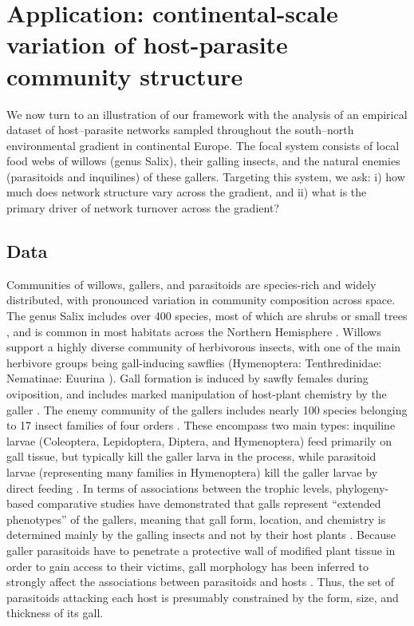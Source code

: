 \documentclass[12pt]{article}
\begin{document}

\section*{Application: continental-scale variation of host-parasite community structure}

We now turn to an illustration of our framework with the analysis of an
empirical dataset of host–parasite networks sampled throughout the south–north
environmental gradient in continental Europe. The focal system consists of
local food webs of willows (genus Salix), their galling insects, and the
natural enemies (parasitoids and inquilines) of these gallers. Targeting this
system, we ask: i) how much does network structure vary across the gradient,
and ii) what is the primary driver of network turnover across the gradient?

\subsection*{Data}

Communities of willows, gallers, and parasitoids are species-rich and
widely distributed, with pronounced variation in community composition across
space. The genus Salix includes over 400 species, most of which are shrubs or
small trees \citep{Argus1997}, and is common in most habitats across the
Northern Hemisphere \citep{Skvortsov1999}. Willows support a highly diverse
community of herbivorous insects, with one of the main herbivore groups being
gall-inducing sawflies (Hymenoptera: Tenthredinidae: Nematinae: Euurina
\citep{Kopelke1999}). Gall formation is induced by sawfly females during
oviposition, and includes marked manipulation of host-plant chemistry by the
galler \citep{Nyman2000}. The enemy community of the gallers includes nearly
100 species belonging to 17 insect families of four orders
\citep{Kopelke2000}. These encompass two main types: inquiline larvae
(Coleoptera, Lepidoptera, Diptera, and Hymenoptera) feed primarily on gall
tissue, but typically kill the galler larva in the process, while parasitoid
larvae (representing many families in Hymenoptera) kill the galler larvae by
direct feeding \citep{Kopelke2003}. In terms of associations between the
trophic levels, phylogeny-based comparative studies have demonstrated that
galls represent ``extended phenotypes'' of the gallers, meaning that gall form,
location, and chemistry is determined mainly by the galling insects and not by
their host plants \citep{Nyman2000}. Because galler parasitoids have to
penetrate a protective wall of modified plant tissue in order to gain access
to their victims, gall morphology has been inferred to strongly affect the
associations between parasitoids and hosts \citep{Nyman2007}. Thus, the set of
parasitoids attacking each host is presumably constrained by the form,
size, and thickness of its gall.
\end{document}
